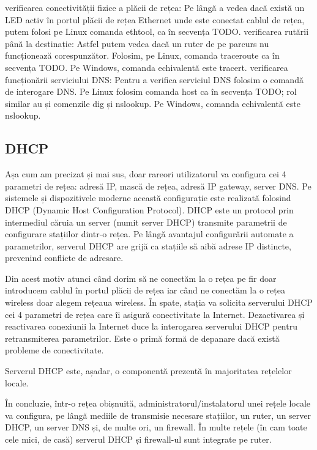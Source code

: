 verificarea conectivității fizice a plăcii de rețea: Pe lângă a vedea dacă există un LED activ în portul plăcii de rețea Ethernet unde este conectat cablul de rețea, putem folosi pe Linux comanda ethtool, ca în secvența TODO.
verificarea rutării până la destinație: Astfel putem vedea dacă un ruter de pe parcurs nu funcționează corespunzător. Folosim, pe Linux, comanda traceroute ca în secvența TODO. Pe Windows, comanda echivalentă este tracert.
verificarea funcționării serviciului DNS: Pentru a verifica serviciul DNS folosim o comandă de interogare DNS. Pe Linux folosim comanda host ca în secvența TODO; rol similar au și comenzile dig și nslookup. Pe Windows, comanda echivalentă este nslookup.

\subsection{DHCP}
\label{sec:net:dhcp}

Așa cum am precizat și mai sus, doar rareori utilizatorul va configura cei 4 parametri de rețea: adresă IP, mască de rețea, adresă IP gateway, server DNS. Pe sistemele și dispozitivele moderne această configurație este realizată folosind DHCP (Dynamic Host Configuration Protocol). DHCP este un protocol prin intermediul căruia un server (numit server DHCP) transmite parametrii de configurare stațiilor dintr-o rețea. Pe lângă avantajul configurării automate a parametrilor, serverul DHCP are grijă ca stațiile să aibă adrese IP distincte, prevenind conflicte de adresare.

Din acest motiv atunci când dorim să ne conectăm la o rețea pe fir doar introducem cablul în portul plăcii de rețea iar când ne conectăm la o rețea wireless doar alegem rețeaua wireless. În spate, stația va solicita serverului DHCP cei 4 parametri de rețea care îi asigură conectivitate la Internet. Dezactivarea și reactivarea conexiunii la Internet duce la interogarea serverului DHCP pentru retransmiterea parametrilor. Este o primă formă de depanare dacă există probleme de conectivitate.

Serverul DHCP este, așadar, o componentă prezentă în majoritatea rețelelor locale.

În concluzie, într-o rețea obișnuită, administratorul/instalatorul unei rețele locale va configura, pe lângă mediile de transmisie necesare stațiilor, un ruter, un server DHCP, un server DNS și, de multe ori, un firewall. În multe rețele (în cam toate cele mici, de casă) serverul DHCP și firewall-ul sunt integrate pe ruter.

